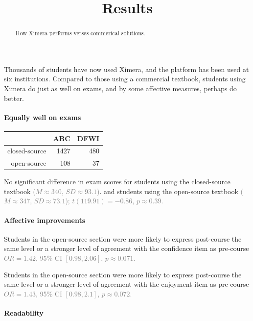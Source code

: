 \documentclass{ximera}
\title{Results}
\begin{document}
\begin{abstract}
  How Ximera performs verses commerical solutions.
\end{abstract}
\maketitle

Thousands of students have now used Ximera, and the platform has been
used at six institutions.  Compared to those using a commercial
textbook, students using Ximera do just as well on exams, and by some
affective measures, perhaps do better.


\paragraph{Equally well on exams}

\begin{center}
  \begin{tabular}{rrr}
    \hline
    & ABC & DFWI \\ 
    \hline
    closed-source & 1427 & 480 \\ 
    open-source & 108 &  37 \\ 
    \hline
  \end{tabular}
\end{center}
    
No significant difference in exam scores for students using the
closed-source textbook \textcolor{gray}{(\(M \approx 340\),
  \(SD \approx 93.1\))}.  and students using the open-source textbook
\textcolor{gray}{(\(M \approx 347\), \(SD \approx 73.1\));}
\textcolor{gray}{\(t( 119.91 ) = -0.86\), \(p\approx 0.39\).}

\paragraph{Affective improvements}

Students in the open-source section were more likely to express
post-course the same level or a stronger level of agreement with the
confidence item as pre-course \textcolor{gray}{\(OR = 1.42\), 95\% CI
  \([ 0.98 , 2.06 ]\), \(p\approx 0.071\).}

Students in the open-source section were more likely to express
post-course the same level or a stronger level of agreement with the
enjoyment item as pre-course \textcolor{gray}{\(OR = 1.43\), 95\% CI
  \([ 0.98 , 2.1 ]\), \(p\approx 0.072\).}

\paragraph{Readability}
\end{document}
